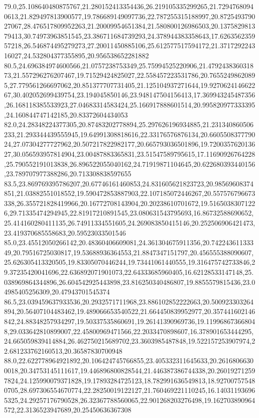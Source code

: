 \documentclass[handout,10pt,t,aspectratio=169]{beamer}
\begin{document}
{79.0,25.108640480875767,21.280152413354436,26.219105335299265,21.72947680940613,21.829497813900577,19.786689149097736,22.787255315188997,20.872549379027067,28.476517809952263,21.20009954651384,21.580800126986503,20.137582981379413,30.74973963851545,23.386711684739293,24.378944383358643,17.626356235957218,26.546874495279273,27.20011450885106,25.612577517594172,21.371729224316027,24.532804377355895,20.956538652281882
80.5,24.696384974600566,21.0757238753349,25.75994525220906,21.479243836031873,21.557296276207467,19.71529424825027,22.558457223531786,20.76552498620895,27.779561266697062,20.851377707731405,21.125104937271644,19.927062414662267,30.402052699439754,23.194045850146,23.948147504156413,17.369943245487356,26.168118385533923,27.04683314583424,25.166917888601514,20.995820977333395,24.160844747142185,20.83372604434053
82.0,24.28348224377305,20.87483202778894,25.297626196934885,21.231340860506233,21.293344439555945,19.64991308818616,22.33176576876134,20.660550837779024,27.07304277727962,20.507217822982177,20.665793036501896,19.720035762013627,30.056593957814904,23.00487883365831,23.51547589795615,17.11690926764228,25.790552191013838,26.896522055040162,24.71919871104645,20.622680393440156,23.789707977388286,20.713308838597655
83.5,23.869769395786207,20.67746161460853,24.831605621823723,20.98569608374851,21.03882551018552,19.590472853887903,22.107185072446267,20.557576796673338,26.355721828419966,20.16772708143904,20.20238610701672,19.51650383071226,29.71335474294945,22.81917210891545,23.080631543795693,16.86732588690652,25.414160280411135,26.74911334551605,24.269083850415146,20.252506906421473,23.419370685558683,20.59523033501546
85.0,23.45512050266142,20.48360406609081,24.361304675911356,20.74224361133349,20.79516725030817,19.53688936364553,21.8847347151797,20.456555388090607,25.626305413320505,19.83305070446244,19.73441061440555,19.316475742733846,29.37235420041696,22.636892071901073,22.64333685960405,16.62128533147148,25.038969864344896,26.604542925443898,23.816250340486807,19.8855579815436,23.04985405256309,20.47943701545374
86.5,23.039459637933536,20.2932571711968,23.886102852222663,20.500923303264894,20.56407104483462,19.489066653540522,21.664450839952977,20.357441602146842,24.88348257934297,19.50337535860691,19.26141390969736,19.119968673668048,29.033642810899007,22.45800969471566,22.2033470898607,16.378901653444295,24.665059839414884,26.462750215689702,23.3603985487848,19.522157253907974,22.681233762160513,20.36587830700948
88.0,22.622778964921892,20.106424745766855,23.405332311645633,20.26168066300018,20.34753145111617,19.446896800828544,21.446387386744338,20.260192712597824,24.125990079371828,19.17893284725123,18.782991636549813,18.927007575480705,28.697306554670774,22.28250019122127,21.760469221110245,16.140311936965325,24.29257176790528,26.32367788560065,22.901268203276498,19.162703890964572,22.3136523947689,20.25450636367308
}
\end{document}
